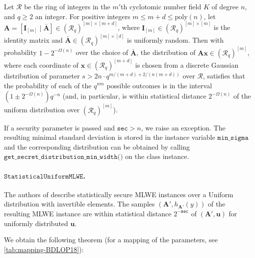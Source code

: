 \begin{theorem}
    Let $\mathcal{R}$ be the ring of integers in the $m'$th cyclotomic number field $K$ of degree $n$, and $q \geq 2$ an integer.
    For positive integers $m \leq m + d \leq \text{poly}(n)$, let $\mathbf{A} = [ \mathbf{I}_{[m]} \mid \bar{\mathbf{A}}] \in (\mathcal{R}_q)^{[m] \times [m+d]}$, where $\mathbf{I}_{[m]} \in (\mathcal{R}_q)^{[m] \times [m]}$ is the identity matrix and $\bar{\mathbf{A}} \in (\mathcal{R}_q)^{[m] \times [d]}$ is uniformly random.
    Then with probability $1 - 2^{-\Omega(n)}$ over the choice of $\bar{\mathbf{A}}$, the distribution of $\mathbf{A}\mathbf{x} \in (\mathcal{R}_q)^{[m]}$, where each coordinate of $\mathbf{x} \in (\mathcal{R}_q)^{[m+d]}$ is chosen from a discrete Gaussian distribution of parameter $s > 2n \cdot q^{m / (m+d) + 2/(n (m+d))}$ over $\mathcal{R}$, satisfies that the probability of each of the $q^{n m}$ possible outcomes is in the interval $(1 \pm 2^{-\Omega(n)}) q^{-n }$ (and, in particular, is within statistical distance $2^{-\Omega(n)}$ of the uniform distribution over $(\mathcal{R}_q)^{[m]}$). %
\end{theorem}

If a security parameter is passed and $\texttt{sec} > n$, we raise an exception.
The resulting minimal standard deviation is stored in the instance variable $\texttt{min\_sigma}$ and the corresponding distribution can be obtained by calling $\texttt{get\_secret\_distribution\_min\_width()}$ on the class instance.



\paragraph{$\texttt{StatisticalUniformMLWE}$.} The authors of \cite{BDLOP18} describe statistically secure MLWE instances over a Uniform distribution with invertible elements. The samples $(\mathbf{A}', h_{\mathbf{A}'}(y))$ of the resulting MLWE instance are within statistical distance $2^{-\texttt{sec}}$ of $(\mathbf{A}', \mathbf{u})$ for uniformly distributed $\mathbf{u}$. %

We obtain the following theorem (for a mapping of the parameters, see \cref{tab:mapping-BDLOP18}): %


